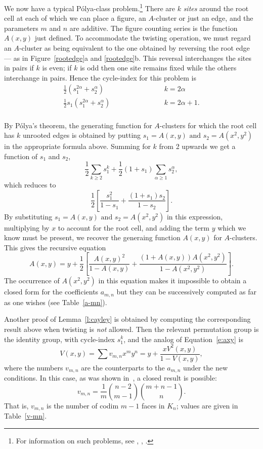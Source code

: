 \documentclass[10pt]{amsart}
\begin{document}
We now have a typical P\'{o}lya-class problem.\footnote{For information on such problems, see \cite{pol}, \cite{pr}, \cite{r3}.} There are $k$ {\em sites} around the root cell at each of which we can place a figure, an $A$-cluster or just an edge, and the parameters $m$ and $n$ are additive.  The figure counting series is the function $A(x,y)$ just defined.   To accommodate the twisting operation, we must regard an $A$-cluster as being equivalent to the one obtained by reversing the root edge --- as in Figure~\ref{rootedge}a and \ref{rootedge}b. This reversal interchanges the sites in pairs if $k$ is even;  if $k$ is odd then one site remains fixed while the others interchange in pairs.   Hence the cycle-index for this problem is
\begin{eqnarray*}
\frac{1}{2}(s_1^{2\alpha} + s_2^\alpha) & \hspace{1in} & k = 2\alpha \\
\frac{1}{2}s_1(s_1^{2\alpha} + s_2^\alpha) & \hspace{1in} & k = 2\alpha + 1. \\
\end{eqnarray*}

\vspace{-.2in}
\noindent By P\'{o}lya's theorem, the generating function for $A$-clusters for which the root cell has $k$ unrooted edges is obtained by putting $s_1 = A(x, y) \mbox{ and } s_2 = A(x^2, y^2)$ in the appropriate formula above. Summing for $k$ from 2 upwards we get a function of $s_1$ and $s_2$,
$$\frac{1}{2}\sum_{k\geq 2} s_1^k + \frac{1}{2}(1 + s_1)\sum_{\alpha \geq 1} s_2^\alpha,$$
which reduces to
$$\frac{1}{2} \left[ \frac{s_1^2}{1 - s_1} + \frac{(1+s_1)s_2}{1 - s_2} \right].$$
By substituting $s_1 = A(x, y) \mbox{ and } s_2 = A(x^2, y^2)$ in this expression, multiplying by $x$ to account for the root cell, and adding the term $y$ which we know must be present, we recover the generaing function $A(x,y)$ for $A$-clusters. This gives the recursive equation
\begin{equation}
A(x,y) = y + \frac{1}{2} \left[ \frac{A(x,y)^2}{1-A(x,y)} + 
\frac{(1+A(x,y))A(x^2,y^2)}{1-A(x^2,y^2)} \right].
\label{e:axy}
\end{equation}
The occurrence of $A(x^2, y^2)$ in this equation makes it impossible to obtain a closed form for the coefficients $a_{m,n}$ but they can be successively computed as far as one wishes (see Table~\ref{a-mn}).

\begin{rem}
Another proof of Lemma~\ref{l:cayley} is obtained by computing the corresponding result above when twisting is {\em not} allowed.  Then the relevant permutation group is the identity group, with cycle-index $s_1^k$, and the analog of Equation~\ref{e:axy} is
$$V(x,y) = \sum v_{m,n} x^m y^n  =  y + \frac{xV^2(x,y)}{1 - V(x,y)},$$
where the numbers $v_{m,n}$ are the counterparts to the $a_{m,n}$ under the new conditions. In this case, as was shown in~\cite{r1}, a closed result is possible:
$$v_{m,n}  = \frac{1}{m} \binom{n-2}{m-1} \binom{m+n-1}{n}.$$
That is, $v_{m,n}$ is the number of codim $m-1$ faces in $K_n$; values are given in Table~\ref{v-mn}.
\end{rem}
\end{document}
